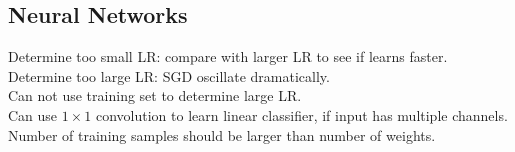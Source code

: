 \subsection*{Neural Networks}

Determine too small LR: compare with larger LR to see if learns faster.\\
Determine too large LR: SGD oscillate dramatically.\\
Can not use training set to determine large LR.\\
Can use $1 \times 1$ convolution to learn linear classifier, if input has multiple channels.\\
Number of training samples should be larger than number of weights.
